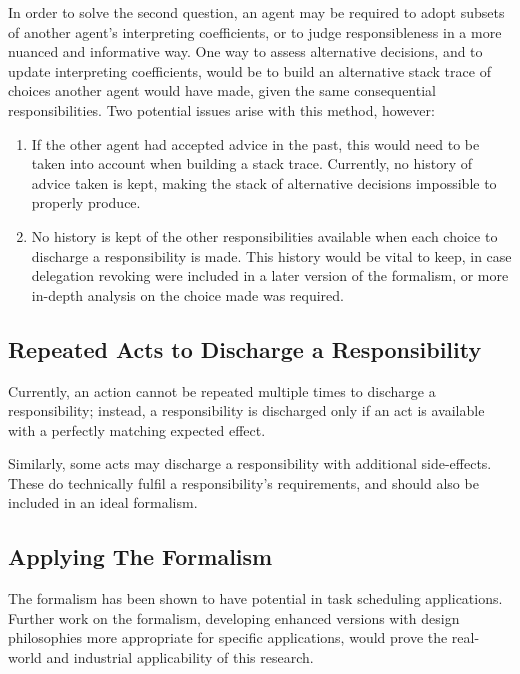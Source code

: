 In order to solve the second question, an agent may be required to adopt subsets of another agent's interpreting coefficients, or to judge responsibleness in a more nuanced and informative way. One way to assess alternative decisions, and to update interpreting coefficients, would be to build an alternative stack trace of choices another agent would have made, given the same consequential responsibilities. Two potential issues arise with this method, however:

\begin{enumerate}
    \item If the other agent had accepted advice in the past, this would need to be taken into account when building a stack trace. Currently, no history of advice taken is kept, making the stack of alternative decisions impossible to properly produce.\par
    \item No history is kept of the other responsibilities available when each choice to discharge a responsibility is made. This history would be vital to keep, in case delegation revoking were included in a later version of the formalism, or more in-depth analysis on the choice made was required.\par
\end{enumerate}

\subsection{Repeated Acts to Discharge a Responsibility}
Currently, an action cannot be repeated multiple times to discharge a responsibility; instead, a responsibility is discharged only if an act is available with a perfectly matching expected effect.\par

Similarly, some acts may discharge a responsibility with additional side-effects. These do technically fulfil a responsibility's requirements, and should also be included in an ideal formalism.\par

\subsection{Applying The Formalism}
The formalism has been shown to have potential in task scheduling applications. Further work on the formalism, developing enhanced versions with design philosophies more appropriate for specific applications, would prove the real-world and industrial applicability of this research.\par

